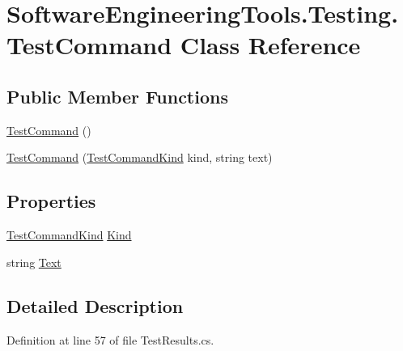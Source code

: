 \hypertarget{class_software_engineering_tools_1_1_testing_1_1_test_command}{\section{Software\+Engineering\+Tools.\+Testing.\+Test\+Command Class Reference}
\label{class_software_engineering_tools_1_1_testing_1_1_test_command}
}
\subsection*{Public Member Functions}
\begin{DoxyCompactItemize}
\item 
\hyperlink{class_software_engineering_tools_1_1_testing_1_1_test_command_a1cb50fd9f03618741ddaa4e209bbcbb2}{Test\+Command} ()
\item 
\hyperlink{class_software_engineering_tools_1_1_testing_1_1_test_command_afbea3989211e3560a048f7f1890d0c22}{Test\+Command} (\hyperlink{namespace_software_engineering_tools_1_1_testing_aa56e9d89003821b285e6eac88565f13a}{Test\+Command\+Kind} kind, string text)
\end{DoxyCompactItemize}
\subsection*{Properties}
\begin{DoxyCompactItemize}
\item 
\hyperlink{namespace_software_engineering_tools_1_1_testing_aa56e9d89003821b285e6eac88565f13a}{Test\+Command\+Kind} \hyperlink{class_software_engineering_tools_1_1_testing_1_1_test_command_aac3f92319409b1abb7b6eb9b25ee4550}{Kind}
\item 
string \hyperlink{class_software_engineering_tools_1_1_testing_1_1_test_command_a42419031b0adefd524c4a2ba3d8cf15f}{Text}
\end{DoxyCompactItemize}


\subsection{Detailed Description}


Definition at line 57 of file Test\+Results.\+cs.



